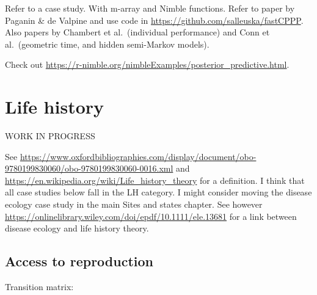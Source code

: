 \documentclass[
  12pt,
]{krantz}
\begin{document}
Refer to a case study. With m-array and Nimble functions. Refer to paper by Paganin \& de Valpine and use code in \url{https://github.com/salleuska/fastCPPP}. Also papers by Chambert et al.~(individual performance) and Conn et al.~(geometric time, and hidden semi-Markov models).

Check out \url{https://r-nimble.org/nimbleExamples/posterior_predictive.html}.

\chapter{Life history}\label{tradeoffs}

WORK IN PROGRESS

See \url{https://www.oxfordbibliographies.com/display/document/obo-9780199830060/obo-9780199830060-0016.xml} and \url{https://en.wikipedia.org/wiki/Life_history_theory} for a definition. I think that all case studies below fall in the LH category. I might consider moving the disease ecology case study in the main Sites and states chapter. See however \url{https://onlinelibrary.wiley.com/doi/epdf/10.1111/ele.13681} for a link between disease ecology and life history theory.

\section{Access to reproduction}\label{access-to-reproduction}

\citet{pradel1997}

Transition matrix:
\end{document}
